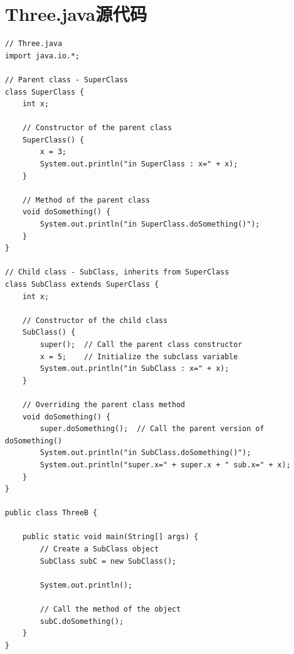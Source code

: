 \documentclass[12pt,a4paper]{article}
\begin{document}
\section*{Three.java源代码}\label{sec:three}
\begin{lstlisting}
// Three.java
import java.io.*;

// Parent class - SuperClass
class SuperClass {
    int x;
    
    // Constructor of the parent class
    SuperClass() {
        x = 3;
        System.out.println("in SuperClass : x=" + x);
    }
    
    // Method of the parent class
    void doSomething() {
        System.out.println("in SuperClass.doSomething()");
    }
}

// Child class - SubClass, inherits from SuperClass
class SubClass extends SuperClass {
    int x;  
    
    // Constructor of the child class
    SubClass() {
        super();  // Call the parent class constructor
        x = 5;    // Initialize the subclass variable
        System.out.println("in SubClass : x=" + x);
    }
    
    // Overriding the parent class method
    void doSomething() {
        super.doSomething();  // Call the parent version of doSomething()
        System.out.println("in SubClass.doSomething()");
        System.out.println("super.x=" + super.x + " sub.x=" + x);
    }
}

public class ThreeB {
    
    public static void main(String[] args) { 
        // Create a SubClass object
        SubClass subC = new SubClass();
        
        System.out.println();
        
        // Call the method of the object
        subC.doSomething();
    }
}

\end{lstlisting}
\end{document}
